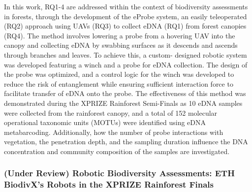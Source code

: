 In this work, RQ1-4 are addressed within the context of biodiversity assessments in forests, through the development of the eProbe system, an easily teleoperated (RQ2) approach using UAVs (RQ3) to collect eDNA (RQ1) from forest canopies (RQ4).  The method involves lowering a probe from a hovering UAV into the canopy and collecting eDNA by swabbing surfaces as it descends and ascends through branches and leaves. To achieve this, a custom- designed robotic system was developed featuring a winch and a probe for eDNA collection. The design of the probe was optimized, and a control logic for the winch was developed to reduce the risk of entanglement while ensuring sufficient interaction force to facilitate transfer of eDNA onto the probe. The effectiveness of this method was demonstrated during the XPRIZE Rainforest Semi-Finals as 10 eDNA samples were collected from the rainforest canopy, and a total of 152 molecular operational taxonomic units (MOTUs) were identified using eDNA metabarcoding. Additionally, how the number of probe interactions with vegetation, the penetration depth, and the sampling duration influence the DNA concentration and community composition of the samples are investigated.

\subsubsection{(Under Review) Robotic Biodiversity Assessments: ETH BiodivX's Robots in the XPRIZE Rainforest Finals}

